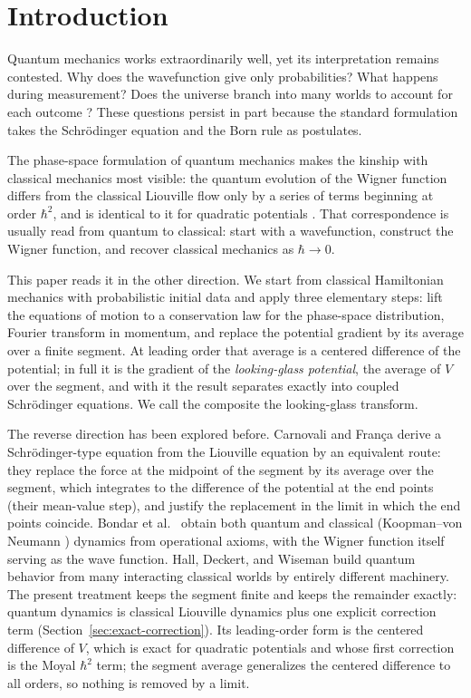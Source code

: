 \documentclass[12pt]{article}
\begin{document}
\section{Introduction}

Quantum mechanics works extraordinarily well, yet its interpretation remains contested.
Why does the wavefunction give only probabilities?
What happens during measurement?
Does the universe branch into many worlds to account for each outcome \cite{everett1973}?
These questions persist in part because the standard formulation takes the Schr\"odinger equation and the Born rule as postulates.

The phase-space formulation of quantum mechanics \cite{wigner1932,groenewold1946,moyal1949,hillery1984} makes the kinship with classical mechanics most visible: the quantum evolution of the Wigner function differs from the classical Liouville flow only by a series of terms beginning at order $\hbar^2$, and is identical to it for quadratic potentials \cite{case2008}.
That correspondence is usually read from quantum to classical: start with a wavefunction, construct the Wigner function, and recover classical mechanics as $\hbar \rightarrow 0$.

This paper reads it in the other direction.
We start from classical Hamiltonian mechanics with probabilistic initial data and apply three elementary steps: lift the equations of motion to a conservation law for the phase-space distribution, Fourier transform in momentum, and replace the potential gradient by its average over a finite segment.
At leading order that average is a centered difference of the potential; in full it is the gradient of the \emph{looking-glass potential}, the average of $V$ over the segment, and with it the result separates exactly into coupled Schr\"odinger equations.
We call the composite the looking-glass transform.

The reverse direction has been explored before.
Carnovali and Fran\c{c}a \cite{carnovali2005} derive a Schr\"odinger-type equation from the Liouville equation by an equivalent route: they replace the force at the midpoint of the segment by its average over the segment, which integrates to the difference of the potential at the end points (their mean-value step), and justify the replacement in the limit in which the end points coincide.
Bondar et al.\ \cite{bondar2012} obtain both quantum and classical (Koopman--von Neumann \cite{koopman1931}) dynamics from operational axioms, with the Wigner function itself serving as the wave function.
Hall, Deckert, and Wiseman \cite{hall2014} build quantum behavior from many interacting classical worlds by entirely different machinery.
The present treatment keeps the segment finite and keeps the remainder exactly: quantum dynamics is classical Liouville dynamics plus one explicit correction term (Section~\ref{sec:exact-correction}).
Its leading-order form is the centered difference of $V$, which is exact for quadratic potentials and whose first correction is the Moyal $\hbar^2$ term; the segment average generalizes the centered difference to all orders, so nothing is removed by a limit.
\end{document}
